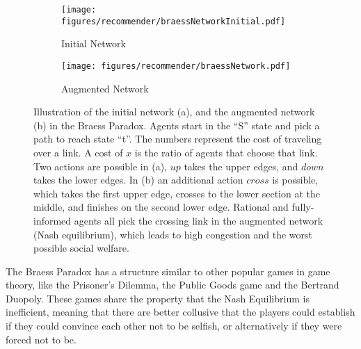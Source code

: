 \begin{figure*}[!ht]
\centering
\begin{subfigure}{.4\textwidth}
  \centering
  \texttt{[image: figures/recommender/braessNetworkInitial.pdf]}
  \caption{Initial Network}
  \label{fig:sub1}
\end{subfigure}%
\begin{subfigure}{.4\textwidth}
  \centering
  \texttt{[image: figures/recommender/braessNetwork.pdf]}
  \caption{Augmented Network}
  \label{fig:sub2}
\end{subfigure}
\caption{Illustration of the initial network (a), and the augmented network (b) in the Braess Paradox. Agents start in the ``S'' state and pick a path to reach state ``t''. The numbers represent the cost of traveling over a link. A cost of $x$ is the ratio of agents that choose that link. Two actions are possible in (a), $\mathit{up}$ takes the upper edges, and $\mathit{down}$ takes the lower edges. In (b) an additional action $\mathit{cross}$ is possible, which takes the first upper edge, crosses to the lower section at the middle, and finishes on the second lower edge. Rational and fully-informed agents all pick the crossing link in the augmented network (Nash equilibrium), which leads to high congestion and the worst possible social welfare.}
\label{fig:braess_network}
\end{figure*}



The Braess Paradox has a structure similar to other popular games in game theory, like the Prisoner's Dilemma, the Public Goods game and the Bertrand Duopoly. These games share the property that the Nash Equilibrium is inefficient, meaning that there are better collusive that the players could establish if they could convince each other not to be selfish, or alternatively if they were forced not to be.


